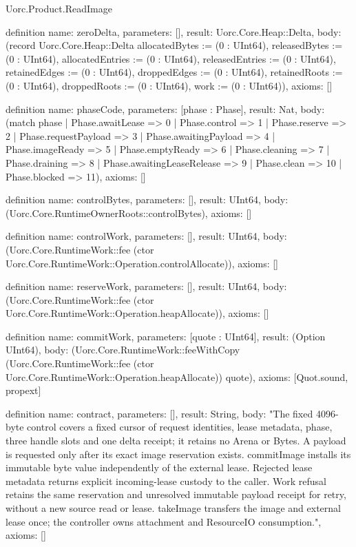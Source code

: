 \begin{lexlean}{Uorc.Product.ReadImage}
\begin{semanticmodule}
definition{
  name: zeroDelta,
  parameters: [],
  result: Uorc.Core.Heap::Delta,
  body: (record Uorc.Core.Heap::Delta {allocatedBytes := (0 : UInt64), releasedBytes := (0 : UInt64), allocatedEntries := (0 : UInt64), releasedEntries := (0 : UInt64), retainedEdges := (0 : UInt64), droppedEdges := (0 : UInt64), retainedRoots := (0 : UInt64), droppedRoots := (0 : UInt64), work := (0 : UInt64)}),
  axioms: []
}

definition{
  name: phaseCode,
  parameters: [phase : Phase],
  result: Nat,
  body: (match phase
    | Phase.awaitLease => 0
    | Phase.control => 1
    | Phase.reserve => 2
    | Phase.requestPayload => 3
    | Phase.awaitingPayload => 4
    | Phase.imageReady => 5
    | Phase.emptyReady => 6
    | Phase.cleaning => 7
    | Phase.draining => 8
    | Phase.awaitingLeaseRelease => 9
    | Phase.clean => 10
    | Phase.blocked => 11),
  axioms: []
}

definition{
  name: controlBytes,
  parameters: [],
  result: UInt64,
  body: (Uorc.Core.RuntimeOwnerRoots::controlBytes),
  axioms: []
}

definition{
  name: controlWork,
  parameters: [],
  result: UInt64,
  body: (Uorc.Core.RuntimeWork::fee (ctor Uorc.Core.RuntimeWork::Operation.controlAllocate)),
  axioms: []
}

definition{
  name: reserveWork,
  parameters: [],
  result: UInt64,
  body: (Uorc.Core.RuntimeWork::fee (ctor Uorc.Core.RuntimeWork::Operation.heapAllocate)),
  axioms: []
}

definition{
  name: commitWork,
  parameters: [quote : UInt64],
  result: (Option UInt64),
  body: (Uorc.Core.RuntimeWork::feeWithCopy (Uorc.Core.RuntimeWork::fee (ctor Uorc.Core.RuntimeWork::Operation.heapAllocate)) quote),
  axioms: [Quot.sound, propext]
}

definition{
  name: contract,
  parameters: [],
  result: String,
  body: "The fixed 4096-byte control covers a fixed cursor of request identities, lease metadata, phase, three handle slots and one delta receipt; it retains no Arena or Bytes. A payload is requested only after its exact image reservation exists. commitImage installs its immutable byte value independently of the external lease. Rejected lease metadata returns explicit incoming-lease custody to the caller. Work refusal retains the same reservation and unresolved immutable payload receipt for retry, without a new source read or lease. takeImage transfers the image and external lease once; the controller owns attachment and ResourceIO consumption.",
  axioms: []
}


\end{semanticmodule}
\end{lexlean}
